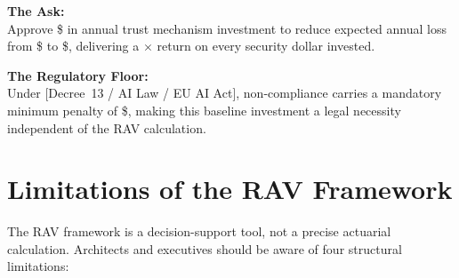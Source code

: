 \begin{tcolorbox}[formulabox,
  title={Trust ROI Calculator: CFO Summary Worksheet}]
\medskip
\textbf{The Ask:} \\
Approve \$\underline{\hspace{1.5cm}} in annual trust mechanism investment to reduce expected annual loss from \$\underline{\hspace{1.5cm}} to \$\underline{\hspace{1.5cm}}, delivering a \underline{\hspace{0.8cm}}$\times$ return on every security dollar invested.

\medskip
\textbf{The Regulatory Floor:} \\
Under \underline{\hspace{2.5cm}} [Decree~13 / AI Law / EU AI Act], non-compliance carries a mandatory minimum penalty of \$\underline{\hspace{1.5cm}}, making this baseline investment a legal necessity independent of the RAV calculation.
\end{tcolorbox}

\section{Limitations of the RAV Framework}
\label{sec:rav-limitations}

The RAV framework is a decision-support tool, not a precise
actuarial calculation.
Architects and executives should be aware of four structural
limitations:

